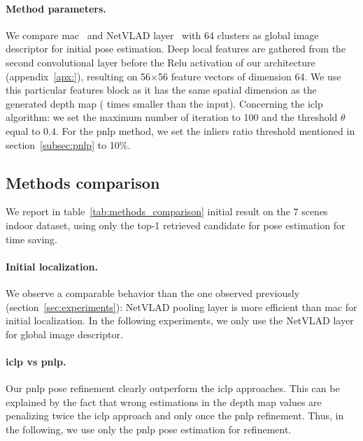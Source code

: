 
\paragraph{Method parameters.} We compare \ac{mac}~\citep{Razavian2014a} and NetVLAD layer~\citep{Arandjelovic2017} with 64 clusters as global image descriptor for initial pose estimation. Deep local features are gathered from the second convolutional layer before the Relu activation of our architecture (appendix~\ref{apx:}), resulting on 56$\times$56 feature vectors of dimension 64. We use this particular features block as it has the same spatial dimension as the generated depth map ( times smaller than the input). Concerning the \ac{iclp} algorithm: we set the maximum number of iteration to 100 and the threshold $\theta$ equal to $0.4$. For the \ac{pnlp} method, we set the inliers ratio threshold mentioned in section~\ref{subsec:pnlp} to 10\%.

\subsection{Methods comparison}

We report in table~\ref{tab:methods_comparison} initial result on the 7 scenes indoor dataset, using only the top-1 retrieved candidate for pose estimation for time saving. 

\paragraph{Initial localization.} We observe a comparable behavior than the one observed previously (section~\ref{sec:experiments}): NetVLAD pooling layer is more efficient than \ac{mac} for initial localization. In the following experiments, we only use the NetVLAD layer for global image descriptor. 

\paragraph{\ac{iclp} vs \ac{pnlp}.} Our \ac{pnlp} pose refinement clearly outperform the \ac{iclp} approaches. This can be explained by the fact that wrong estimations in the depth map values are penalizing twice the \ac{iclp} approach and only once the \ac{pnlp} refinement. Thus, in the following, we use only the \ac{pnlp} pose estimation for refinement.

